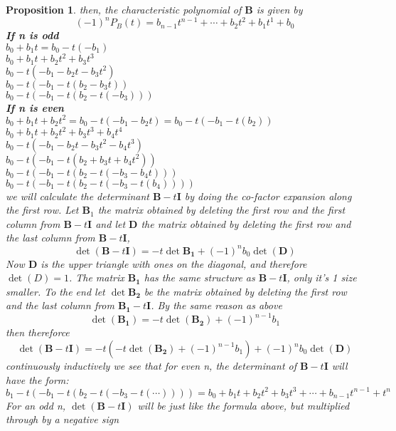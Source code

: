 \documentclass[10pt]{article}
\newtheorem{propo}{Proposition}[section]
\begin{document}
\begin{propo}
    then, the characteristic polynomial of $\mathbf{B}$ is given by \\ 
    \[ (-1)^{n}P_{B}(t) = b_{n-1} t^{n-1} + \cdots + b_2 t^{2} + b_1 t^{1} + b_0 \]
    \textbf{If n is odd}\\
    $b_0 + b_1t = b_0 -t(-b_1)$\\
    \newline 
    $b_0 + b_1t  + b_2 t^2 + b_3 t^3$ \\
    $b_0 -t(-b_1 - b_2 t - b_3 t^2)$ \\
    $b_0 -t(-b_1 -t(b_2 -b_3 t))$ \\
    $b_0 -t(-b_1 -t(b_2 -t(-b_3)))$\\
    \newline 
    \textbf{If n is even}\\
    $b_0 + b_1t  + b_2t^2= b_0 -t(-b_1 - b_2t) = b_0 -t(-b_1 - t(b_2))$\\
    \newline
    $b_0 + b_1t  + b_2 t^2 + b_3 t^3 + b_4 t^4$\\
    $b_0 -t(-b_1 -b_2t -b_3t^2 - b_4 t^3)$\\
    $b_0 -t(-b_1 -t(b_2 +b_3t + b_4 t^2))$\\
    $b_0 -t(-b_1 -t(b_2 -t(-b_3 -b_4t)))$\\
    $b_0 -t(-b_1 -t(b_2 -t(-b_3 -t(b_4))))$\\
    \newline 
    we will calculate the determinant $\mathbf{B} - t \mathbf{I}$ by doing the co-factor expansion along the first row.
    Let $\mathbf{B}_1$ the matrix obtained by deleting the first row and the first column from $\mathbf{B} - t \mathbf{I}$
    and let $\mathbf{D}$ the matrix obtained by deleting the first row and the last column from $\mathbf{B} - t \mathbf{I}$,
    \[ \det (\mathbf{B} - t \mathbf{I} ) = -t \det \mathbf{B_1} + (-1)^n b_0 \det (\mathbf{D})   \]
    Now $\mathbf{D}$ is the upper triangle with ones on the diagonal, and therefore $\det(D) = 1$. The matrix $\mathbf{B_1}$ has 
    the same structure as $\mathbf{B} - t \mathbf{I}$, only it's 1 size smaller. To the end let $\det \mathbf{B_2}$ be the matrix
    obtained by deleting the first row and the last column from $\mathbf{B_1} - t \mathbf{I}$. By the same reason as above
    \[ \det(\mathbf{B_1}) = -t \det (\mathbf{B_2}) + (-1)^{n-1} b_1 \]
    then thereforce\\
    \[ \det (\mathbf{B} - t \mathbf{I} ) = -t(-t \det (\mathbf{B_2}) + (-1)^{n-1} b_1)  + (-1)^n b_0 \det (\mathbf{D})   \]
    continuously inductively we see that for even n, the determinant of $\mathbf{B} - t \mathbf{I}$ will have the form:
    \[ b_1 -t(-b_1 -t(b_2 -t(-b_3 -t(\cdots)))) = b_0 + b_1t + b_2t^2 + b_3t^3 + \cdots + b_{n-1} t^{n-1} + t^n  \]
    For an odd n, $ \det (\mathbf{B} - t \mathbf{I}) $ will be just like the formula above, but multiplied through by a negative sign

\end{propo} 
\end{document}
